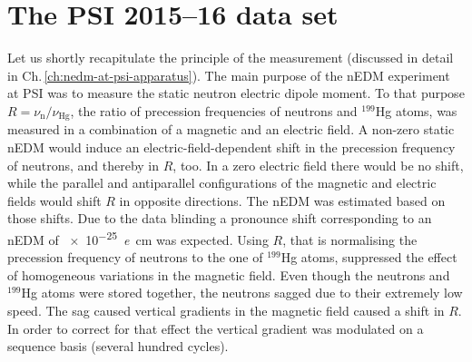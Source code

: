 \section{The PSI 2015--16 data set}
Let us shortly recapitulate the principle of the measurement (discussed in detail in Ch.\,\ref{ch:nedm-at-psi-apparatus}). The main purpose of the nEDM experiment at PSI was to measure the static neutron electric dipole moment. To that purpose $R = \nu_\text{n} / \nu_\text{Hg}$, the ratio of precession frequencies of neutrons and ${}^{199}$Hg atoms, was measured in a combination of a magnetic and an electric field. A non-zero static nEDM would induce an electric-field-dependent shift in the precession frequency of neutrons, and thereby in $R$, too. In a zero electric field there would be no shift, while the parallel and antiparallel configurations of the magnetic and electric fields would shift $R$ in opposite directions.
The nEDM was estimated based on those shifts. Due to the data blinding
a pronounce shift corresponding to an nEDM of \SI{e-25}{\elementarycharge\centi\meter} was expected. Using $R$, that is normalising the precession frequency of neutrons to the one of ${}^{199}$Hg atoms, suppressed the effect of homogeneous variations in the magnetic field. Even though the neutrons and ${}^{199}$Hg atoms were stored together, the neutrons sagged due to their extremely low speed. The sag caused vertical gradients in the magnetic field caused a shift in $R$. In order to correct for that effect the vertical gradient was modulated on a sequence basis (several hundred cycles).

